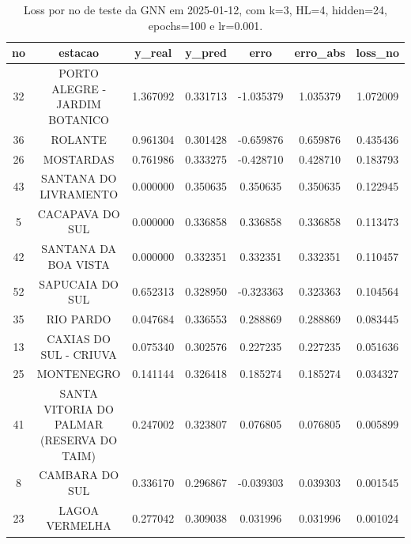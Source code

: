 \begin{table}[h]
\centering
\caption{Loss por no de teste da GNN em 2025-01-12, com k=3, HL=4, hidden=24, epochs=100 e lr=0.001.}
\label{tab:gnn_loss_k3_hl4_h24_e100_d20250112}
\begin{tabular}{ccccccc}
\toprule
no & estacao & y\_real & y\_pred & erro & erro\_abs & loss\_no \\
\midrule
32 & PORTO ALEGRE - JARDIM BOTANICO & 1.367092 & 0.331713 & -1.035379 & 1.035379 & 1.072009 \\
36 & ROLANTE & 0.961304 & 0.301428 & -0.659876 & 0.659876 & 0.435436 \\
26 & MOSTARDAS & 0.761986 & 0.333275 & -0.428710 & 0.428710 & 0.183793 \\
43 & SANTANA DO LIVRAMENTO & 0.000000 & 0.350635 & 0.350635 & 0.350635 & 0.122945 \\
5 & CACAPAVA DO SUL & 0.000000 & 0.336858 & 0.336858 & 0.336858 & 0.113473 \\
42 & SANTANA DA BOA VISTA & 0.000000 & 0.332351 & 0.332351 & 0.332351 & 0.110457 \\
52 & SAPUCAIA DO SUL & 0.652313 & 0.328950 & -0.323363 & 0.323363 & 0.104564 \\
35 & RIO PARDO & 0.047684 & 0.336553 & 0.288869 & 0.288869 & 0.083445 \\
13 & CAXIAS DO SUL - CRIUVA & 0.075340 & 0.302576 & 0.227235 & 0.227235 & 0.051636 \\
25 & MONTENEGRO & 0.141144 & 0.326418 & 0.185274 & 0.185274 & 0.034327 \\
41 & SANTA VITORIA DO PALMAR (RESERVA DO TAIM) & 0.247002 & 0.323807 & 0.076805 & 0.076805 & 0.005899 \\
8 & CAMBARA DO SUL & 0.336170 & 0.296867 & -0.039303 & 0.039303 & 0.001545 \\
23 & LAGOA VERMELHA & 0.277042 & 0.309038 & 0.031996 & 0.031996 & 0.001024 \\
\bottomrule
\end{tabular}
\end{table}
